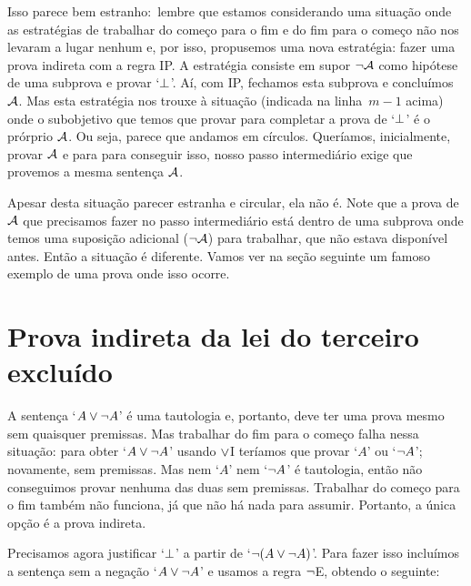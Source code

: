 Isso parece bem estranho: lembre que estamos considerando uma situação onde as estratégias de trabalhar do começo para o fim e do fim para o começo não nos levaram a lugar nenhum e, por isso, propusemos uma nova estratégia: fazer uma prova indireta com a regra IP. A estratégia consiste em supor $\neg \mathcal{A}$ como hipótese de uma subprova e provar `$\bot$'. Aí, com IP, fechamos esta subprova e concluímos $\mathcal{A}$. Mas esta estratégia nos trouxe à situação (indicada na linha~$m - 1$ acima) onde o subobjetivo que temos que provar para completar a prova de `$\bot$' é o prórprio $\mathcal{A}$. Ou seja, parece que andamos em círculos. Queríamos, inicialmente, provar $\mathcal{A}$ e para para conseguir isso, nosso passo intermediário exige que provemos a mesma sentença $\mathcal{A}$.

Apesar desta situação parecer estranha e circular, ela não é. Note que a prova de $\mathcal{A}$ que precisamos fazer no passo intermediário está dentro de uma subprova onde temos uma suposição adicional ($\neg \mathcal{A}$) para trabalhar, que não estava disponível antes. Então a situação é diferente. Vamos ver na seção seguinte um famoso exemplo de uma prova onde isso ocorre.

 


\section{Prova indireta da lei do terceiro excluído}\label{s:proofLEM}

A sentença `$A \vee \neg A$' é uma tautologia e, portanto, deve ter uma prova mesmo sem quaisquer premissas. Mas trabalhar do fim para o começo falha nessa situação: para obter `$A \vee \neg A$' usando $\vee$I teríamos que provar `$A$' ou `$\neg A$'; novamente, sem premissas. Mas nem `$A$' nem  `$\neg A$' é tautologia, então não conseguimos provar nenhuma das duas sem premissas. Trabalhar  do começo para o fim também não funciona, já que não há nada para assumir. Portanto, a única opção é a prova indireta.
\begin{fitchproof}
	\open
	\ellipsesline
	\close
\end{fitchproof}

Precisamos agora justificar `$\bot$' a partir de `$\neg(A \vee \neg A)$'. Para fazer isso incluímos a sentença sem a negação   `$A \vee\neg A$' e usamos a regra  $\neg$E, obtendo o seguinte:
\begin{fitchproof}
	\open
	\ellipsesline
	\close
\end{fitchproof}

